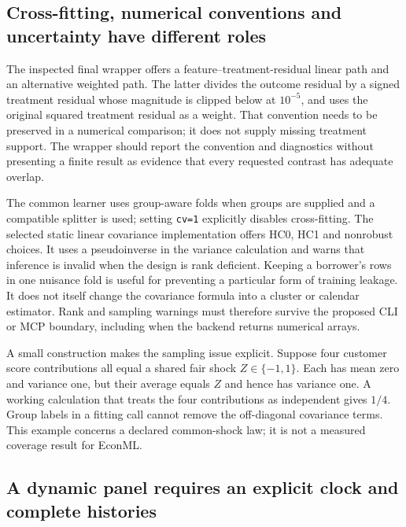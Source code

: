 \subsection{Cross-fitting, numerical conventions and uncertainty have different roles}
\label{exec19:econml-inference}

The inspected final wrapper offers a feature--treatment-residual linear path
and an alternative weighted path. The latter divides the outcome residual
by a signed treatment residual whose magnitude is clipped below at $10^{-5}$,
and uses the original squared treatment residual as a weight. That convention
needs to be preserved in a numerical comparison; it does not supply missing
treatment support. The wrapper should report the convention and diagnostics
without presenting a finite result as evidence that every requested contrast
has adequate overlap.~\citep{exec19_econml_source}

The common learner uses group-aware folds when groups are supplied and a
compatible splitter is used; setting \texttt{cv=1} explicitly disables
cross-fitting. The selected static linear covariance implementation offers
HC0, HC1 and nonrobust choices. It uses a pseudoinverse in the variance
calculation and warns that inference is invalid when the design is rank
deficient. Keeping a borrower's rows in one nuisance fold is useful for
preventing a particular form of training leakage. It does not itself change
the covariance formula into a cluster or calendar estimator. Rank and
sampling warnings must therefore survive the proposed CLI or MCP boundary,
including when the backend returns numerical arrays.
\citep{exec19_econml_source}

A small construction makes the sampling issue explicit. Suppose four customer
score contributions all equal a shared fair shock $Z\in\{-1,1\}$. Each
has mean zero and variance one, but their average equals $Z$ and hence has
variance one. A working calculation that treats the four contributions as
independent gives $1/4$. Group labels in a fitting call cannot remove the
off-diagonal covariance terms. This example concerns a declared common-shock
law; it is not a measured coverage result for EconML.
\citep{exec19_econml_reference}

\subsection{A dynamic panel requires an explicit clock and complete histories}
\label{exec19:econml-panel}

